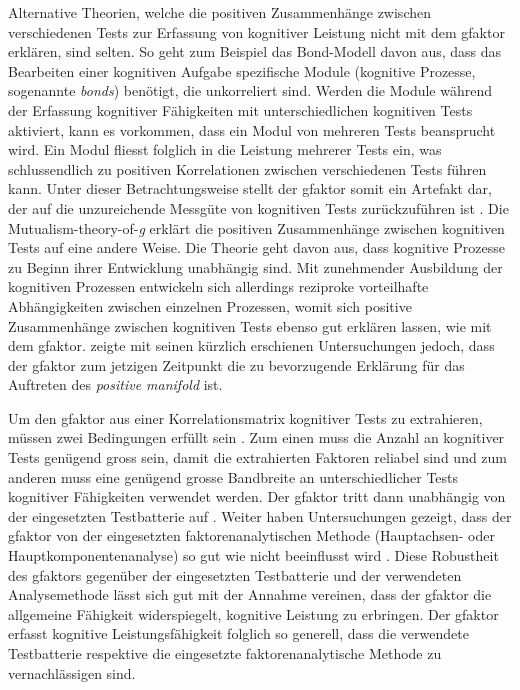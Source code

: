 \documentclass[11pt, twoside, a4paper]{book}		%
\begin{document}
Alternative Theorien, welche die positiven Zusammenhänge zwischen verschiedenen Tests zur Erfassung von kognitiver Leistung nicht mit dem \gls{gfaktor} erklären, sind selten. 
So geht zum Beispiel das Bond-Modell \citep{Thomson1916} davon aus, dass das Bearbeiten einer kognitiven Aufgabe spezifische Module (kognitive Prozesse, sogenannte \textit{bonds}) benötigt, die unkorreliert sind. Werden die Module während der Erfassung kognitiver Fähigkeiten mit unterschiedlichen kognitiven Tests aktiviert, kann es vorkommen, dass ein Modul von mehreren Tests beansprucht wird. Ein Modul fliesst folglich in die Leistung mehrerer Tests ein, was schlussendlich zu positiven Korrelationen zwischen verschiedenen Tests führen kann. Unter dieser Betrachtungsweise stellt der \gls{gfaktor} somit ein Artefakt dar, der auf die unzureichende Messgüte von kognitiven Tests zurückzuführen ist \citep[für einen Gegenüberstellung zwischen dem \gls{gfaktor} und dem Bond-Modell siehe][]{Bartholomew2013}.
Die Mutualism-theory-of-\textit{g} \citep{VanDerMaas2006} erklärt die positiven Zusammenhänge zwischen kognitiven Tests auf eine andere Weise. Die Theorie geht davon aus, dass kognitive Prozesse zu Beginn ihrer Entwicklung unabhängig sind. Mit zunehmender Ausbildung der kognitiven Prozessen entwickeln sich allerdings reziproke vorteilhafte Abhängigkeiten zwischen einzelnen Prozessen, womit sich positive Zusammenhänge zwischen kognitiven Tests ebenso gut erklären lassen, wie mit dem \gls{gfaktor}. \citet{Gignac2014, Gignac2016} zeigte mit seinen kürzlich erschienen Untersuchungen jedoch, dass der \gls{gfaktor} zum jetzigen Zeitpunkt die zu bevorzugende Erklärung für das Auftreten des \textit{positive man\-i\-fold} ist. 

Um den \gls{gfaktor} aus einer Korrelationsmatrix kognitiver Tests zu extrahieren, müssen zwei Bedingungen erfüllt sein \citep[][S. 73]{Jensen1998b}. Zum einen muss die Anzahl an kognitiver Tests genügend gross sein, damit die extrahierten Faktoren reliabel sind und zum anderen muss eine genügend grosse Bandbreite an unterschiedlicher Tests kognitiver Fähigkeiten verwendet werden. Der \gls{gfaktor} tritt dann unabhängig von der eingesetzten Testbatterie auf \citep{Johnson2004, Johnson2008}. Weiter haben Untersuchungen gezeigt, dass der \gls{gfaktor} von der eingesetzten faktorenanalytischen Methode (Hauptachsen- oder Hauptkomponentenanalyse) so gut wie nicht beeinflusst wird \citep{Jensen1994, Ree1991}.
Diese Robustheit des \gls{gfaktor}s gegenüber der eingesetzten Testbatterie und der verwendeten Analysemethode lässt sich gut mit der Annahme vereinen, dass der \gls{gfaktor} die allgemeine Fähigkeit widerspiegelt, kognitive Leistung zu erbringen. Der \gls{gfaktor} erfasst kognitive Leistungsfähigkeit folglich so generell, dass die verwendete Testbatterie respektive die eingesetzte faktorenanalytische Methode zu vernachlässigen sind.
\end{document}
